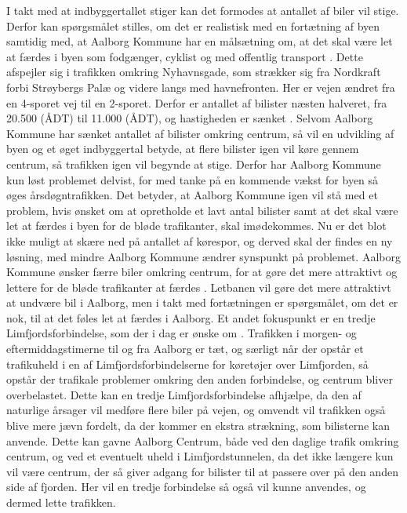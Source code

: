 \newline \indent{     }  I takt med at indbyggertallet stiger kan det formodes at antallet af biler vil stige. Derfor kan spørgsmålet stilles, om det er realistisk med en fortætning af byen samtidig med, at Aalborg Kommune har en målsætning om, at det skal være let at færdes i byen som fodgænger, cyklist og med offentlig transport \citep{kommuneplan3}. Dette afspejler sig i trafikken omkring Nyhavnsgade, som strækker sig fra Nordkraft forbi Strøybergs Palæ og videre langs med havnefronten. Her er vejen ændret fra en 4-sporet vej til en 2-sporet. Derfor er antallet af bilister næsten halveret, fra 20.500 (ÅDT) til 11.000 (ÅDT), og hastigheden er sænket \citep[ s. 6]{lokalplan}. Selvom Aalborg Kommune har sænket antallet af bilister omkring centrum, så vil en udvikling af byen og et øget indbyggertal betyde, at flere bilister igen vil køre gennem centrum, så trafikken igen vil begynde at stige. Derfor har Aalborg Kommune kun løst problemet delvist, for med tanke på en kommende vækst for byen så øges årsdøgntrafikken. Det betyder, at Aalborg Kommune igen vil stå med et problem, hvis ønsket om at opretholde et lavt antal bilister samt at det skal være let at færdes i byen for de bløde trafikanter, skal imødekommes. Nu er det blot ikke muligt at skære ned på antallet af kørespor, og derved skal der findes en ny løsning, med mindre Aalborg Kommune ændrer synspunkt på problemet.
\newline \indent{     }  Aalborg Kommune ønsker færre biler omkring centrum, for at gøre det mere attraktivt og lettere for de bløde trafikanter at færdes \citep{aalborgletbane} \citep{nordjyske}. Letbanen vil gøre det mere attraktivt at undvære bil i Aalborg, men i takt med fortætningen er spørgsmålet, om det er nok, til at det føles let at færdes i Aalborg. Et andet fokuspunkt er en tredje Limfjordsforbindelse, som der i dag er ønske om \citep{limfjordsforbindelsen}. Trafikken i morgen- og eftermiddagstimerne til og fra Aalborg er tæt, og særligt når der opstår et trafikuheld i en af Limfjordsforbindelserne for køretøjer over Limfjorden, så opstår der trafikale problemer omkring den anden forbindelse, og centrum bliver overbelastet. Dette kan en tredje Limfjordsforbindelse afhjælpe, da den af naturlige årsager vil medføre flere biler på vejen, og omvendt vil trafikken også blive mere jævn fordelt, da der kommer en ekstra strækning, som bilisterne kan anvende. Dette kan gavne Aalborg Centrum, både ved den daglige trafik omkring centrum, og ved et eventuelt uheld i Limfjordstunnelen, da det ikke længere kun vil være centrum, der så giver adgang for bilister til at passere over på den anden side af fjorden. Her vil en tredje forbindelse så også vil kunne anvendes, og dermed lette trafikken. 
